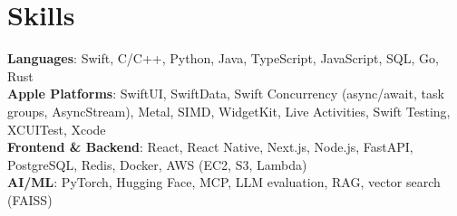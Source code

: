 \def\COURSEWORK{Data Structures, Algorithms, Databases, Human-Centered Interfaces, Machine Learning}
\def\ACTIVITIES{Notion Campus Leader, Full-Stack Development Head TA (100+ students), Society of Women Engineers}



\section{Skills}
 \begin{itemize}[leftmargin=0.15in, label={}]
    \small{\item{
     \textbf{Languages}{: Swift, C/C++, Python, Java, TypeScript, JavaScript, SQL, Go, Rust} \\
     \textbf{Apple Platforms}{: SwiftUI, SwiftData, Swift Concurrency (async/await, task groups, AsyncStream), Metal, SIMD, WidgetKit, Live Activities, Swift Testing, XCUITest, Xcode} \\
     \textbf{Frontend \& Backend}{: React, React Native, Next.js, Node.js, FastAPI, PostgreSQL, Redis, Docker, AWS (EC2, S3, Lambda)} \\
     \textbf{AI/ML}{: PyTorch, Hugging Face, MCP, LLM evaluation, RAG, vector search (FAISS)}
    }}
 \end{itemize}


